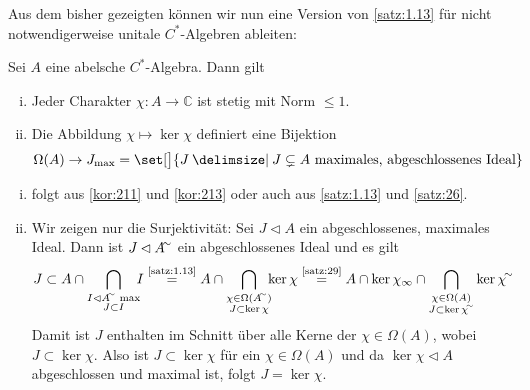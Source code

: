 Aus dem bisher gezeigten können wir nun eine Version von \autoref{satz:1.13} für nicht notwendigerweise unitale $C^*$-Algebren ableiten: 

\begin{korollar}[{name=[Stetigkeit von Charakteren und Zusammenhang mit maximalen Idealen]}]
	Sei $A$ eine abelsche $C^*$-Algebra. Dann gilt
	\begin{enumerate}[(i),itemsep=0pt]
		\item Jeder Charakter $\chi \colon A \to \mathbb{C}$ ist stetig mit Norm $\le 1$.
		\item Die Abbildung $\chi \mapsto \ker \chi$ definiert eine Bijektion 
		\[
			\Omega(A) \to J_{\max} = \set[\big]{J \given J \subsetneq A \text{ maximales, abgeschlossenes Ideal}}
		\]
	\end{enumerate}
\end{korollar}
\begin{beweis}
	\leavevmode
	\begin{enumerate}[(i),itemsep=0pt]
		\item folgt aus \autoref{kor:211} und \autoref{kor:213} oder auch aus \autoref{satz:1.13} und \autoref{satz:26}.
		\item Wir zeigen nur die Surjektivität: Sei $J \lhd A$ ein abgeschlossenes, maximales Ideal. 
		Dann ist $J \lhd A^\simm$ ein abgeschlossenes Ideal und es gilt
		\begin{align}
			J \subset A \cap \bigcap_{\substack{I \lhd A^\simm \text{ max} \\ J \subset I} } \hspace{-1ex} I  
			\StackText{\ref{satz:1.13}}{=} A \cap \bigcap_{\substack{\chi \in \Omega(A^\simm) \\ J \subset \ker \chi}} \hspace{-1ex}\ker \chi 
			&\StackText{\ref{satz:29}}{=} A \cap \ker \chi_\infty \cap \bigcap_{\substack{\chi \in \Omega(A) \\ J \subset \ker \chi^\simm}} \ker \chi^\simm  
		\end{align}
		Damit ist $J$ enthalten im Schnitt über alle Kerne der $\chi \in \Omega(A)$, wobei $J \subset \ker \chi$. 
		Also ist $J \subset \ker \chi$ für ein $\chi \in \Omega(A)$ und da $\ker \chi \lhd A$ abgeschlossen und maximal ist, folgt $J=\ker \chi$. \qedhere
	\end{enumerate}
\end{beweis}

